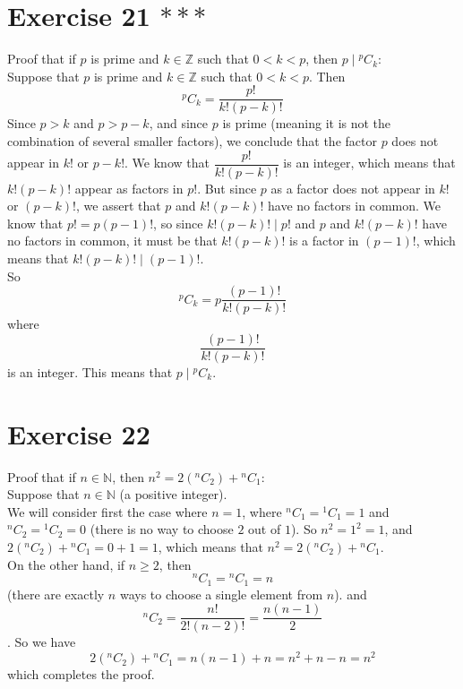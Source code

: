 \documentclass[12pt]{article}
\newcommand{\N}{\mathbb{N}}
\newcommand{\Z}{\mathbb{Z}}
\newcommand*{\comb}[2]{{}^{#1}C_{#2}}
\begin{document}
    \section*{Exercise 21 $***$}
    Proof that if $p$ is prime and $k \in \Z$
    such that $0 < k < p$,
    then $p \mid \comb{p}{k}$: \\
    Suppose that $p$ is prime and $k \in \Z$
    such that $0 < k < p$.
    Then 
    \[ \comb{p}{k} = \dfrac{p!}{k!(p-k)!} \]
    Since $p > k$ and $p > p - k$,
    and since $p$ is prime
    (meaning it is not the combination of several smaller factors),
    we conclude that the factor $p$ does not appear in $k!$ or $p-k!$.
    We know that $\dfrac{p!}{k!(p-k)!}$ is an integer,
    which means that $k!(p-k)!$ appear as factors in $p!$.
    But since $p$ as a factor does not appear in $k!$ or $(p-k)!$,
    we assert that $p$ and $k!(p-k)!$ have no factors in common.
    We know that $p! = p(p-1)!$,
    so since $k!(p-k)! \mid p!$
    and $p$ and $k!(p-k)!$ have no factors in common,
    it must be that $k!(p-k)!$ is a factor in $(p-1)!$,
    which means that $k!(p-k)! \mid (p-1)!$. \\
    So 
    \[ \comb{p}{k} = p\dfrac{(p-1)!}{k!(p-k)!} \]
    where
    \[ \dfrac{(p-1)!}{k!(p-k)!} \]
    is an integer.
    This means that $p \mid \comb{p}{k}$. \\

    \section*{Exercise 22}
    Proof that if $n \in \N$,
    then $n^2 = 2(\comb{n}{2}) + \comb{n}{1}$: \\
    Suppose that $n \in \N$ (a positive integer). \\
    We will consider first the case where $n = 1$,
    where $\comb{n}{1} = \comb{1}{1} = 1$
    and $\comb{n}{2} = \comb{1}{2} = 0$
    (there is no way to choose $2$ out of $1$).
    So $n^2 = 1^2 = 1$,
    and $2(\comb{n}{2}) + \comb{n}{1} = 0 + 1 = 1$,
    which means that $n^2 = 2(\comb{n}{2}) + \comb{n}{1}$. \\
    On the other hand,
    if $n \geqslant 2$,
    then 
    \[ \comb{n}{1} = \comb{n}{1} = n \]
    (there are exactly $n$ ways to choose a single element from $n$).
    and
    \[ \comb{n}{2} = \dfrac{n!}{2!(n-2)!}
    = \dfrac{n(n-1)}{2} \].
    So we have
    \[ 2(\comb{n}{2}) + \comb{n}{1} = n(n-1) + n = n^2 + n - n = n^2 \]
    which completes the proof. \\
\end{document}

